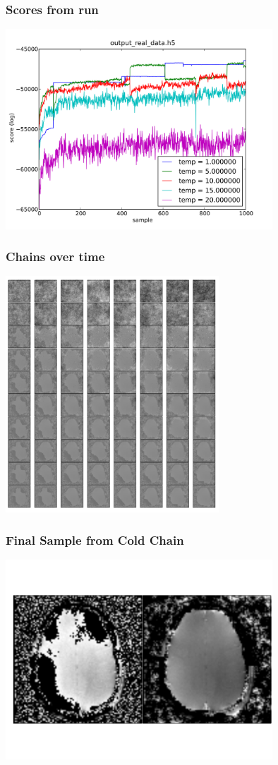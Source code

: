 \documentclass[compress]{beamer}
\begin{document}
\begin{frame}
  \frametitle{Scores from run}
  \includegraphics[width=10cm]{data_scores}
\end{frame}

\begin{frame}
  \frametitle{Chains over time}
  \includegraphics[width=8cm]{data_replicas}
\end{frame}

\begin{frame}
  \frametitle{Final Sample from Cold Chain}
  \includegraphics[width=10cm]{data_results}
\end{frame}
\end{document}
